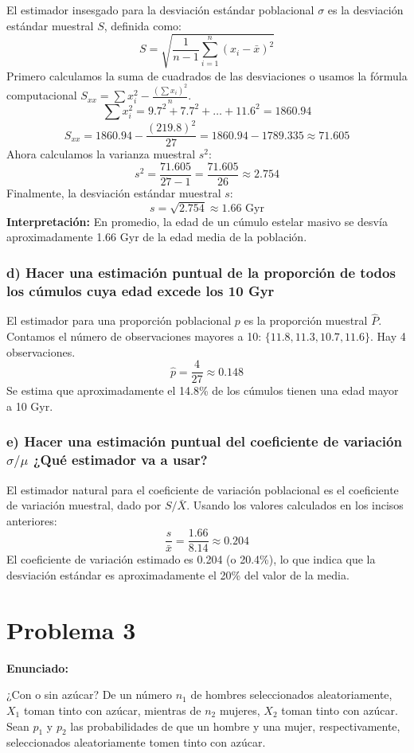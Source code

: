 \documentclass[12pt]{article}
\begin{document}
El estimador insesgado para la desviación estándar poblacional $\sigma$ es la desviación estándar muestral $S$, definida como:
$$ S = \sqrt{\frac{1}{n-1} \sum_{i=1}^{n} (x_i - \bar{x})^2} $$
Primero calculamos la suma de cuadrados de las desviaciones o usamos la fórmula computacional $S_{xx} = \sum x_i^2 - \frac{(\sum x_i)^2}{n}$.
$$ \sum x_i^2 = 9.7^2 + 7.7^2 + \dots + 11.6^2 = 1860.94 $$
$$ S_{xx} = 1860.94 - \frac{(219.8)^2}{27} = 1860.94 - 1789.335 \approx 71.605 $$
Ahora calculamos la varianza muestral $s^2$:
$$ s^2 = \frac{71.605}{27-1} = \frac{71.605}{26} \approx 2.754 $$
Finalmente, la desviación estándar muestral $s$:
$$ s = \sqrt{2.754} \approx 1.66 \text{ Gyr} $$
\textbf{Interpretación:} En promedio, la edad de un cúmulo estelar masivo se desvía aproximadamente 1.66 Gyr de la edad media de la población.

\subsubsection*{d) Hacer una estimación puntual de la proporción de todos los cúmulos cuya edad excede los 10 Gyr}

El estimador para una proporción poblacional $p$ es la proporción muestral $\hat{P}$.
Contamos el número de observaciones mayores a 10: $\{11.8, 11.3, 10.7, 11.6\}$. Hay 4 observaciones.
$$ \hat{p} = \frac{4}{27} \approx 0.148 $$
Se estima que aproximadamente el 14.8\% de los cúmulos tienen una edad mayor a 10 Gyr.

\subsubsection*{e) Hacer una estimación puntual del coeficiente de variación $\sigma/\mu$ ¿Qué estimador va a usar?}

El estimador natural para el coeficiente de variación poblacional es el coeficiente de variación muestral, dado por $S/\bar{X}$.
Usando los valores calculados en los incisos anteriores:
$$ \frac{s}{\bar{x}} = \frac{1.66}{8.14} \approx 0.204 $$
El coeficiente de variación estimado es 0.204 (o 20.4\%), lo que indica que la desviación estándar es aproximadamente el 20\% del valor de la media.


\section{Problema 3}

\textbf{Enunciado:}

¿Con o sin azúcar? De un número $n_1$ de hombres seleccionados aleatoriamente, $X_1$ toman tinto con azúcar, mientras de $n_2$ mujeres, $X_2$ toman tinto con azúcar. Sean $p_1$ y $p_2$ las probabilidades de que un hombre y una mujer, respectivamente, seleccionados aleatoriamente tomen tinto con azúcar.
\end{document}

